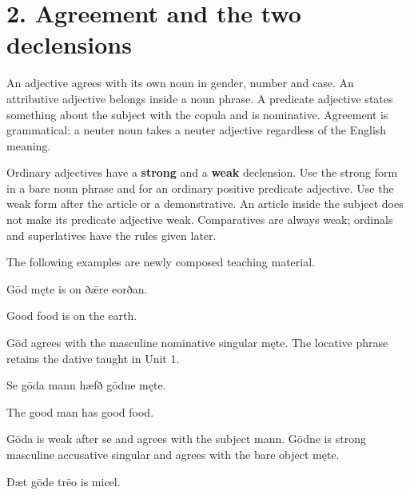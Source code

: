 \section*{2. Agreement and the two declensions}

An adjective agrees with its own noun in gender, number and case. An attributive adjective belongs inside a noun phrase. A predicate adjective states something about the subject with the copula and is nominative. Agreement is grammatical: a neuter noun takes a neuter adjective regardless of the English meaning.

Ordinary adjectives have a \textbf{strong} and a \textbf{weak} declension. Use the strong form in a bare noun phrase and for an ordinary positive predicate adjective. Use the weak form after the article or a demonstrative. An article inside the subject does not make its predicate adjective weak. Comparatives are always weak; ordinals and superlatives have the rules given later.

The following examples are newly composed teaching material.

Gōd męte is on ðǣre eorðan.

Good food is on the earth.

Gōd agrees with the masculine nominative singular męte. The locative phrase retains the dative taught in Unit 1.

Se gōda mann hæfð gōdne męte.

The good man has good food.

Gōda is weak after se and agrees with the subject mann. Gōdne is strong masculine accusative singular and agrees with the bare object męte.

Ðæt gōde trēo is micel.

